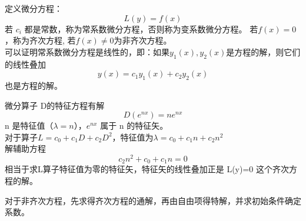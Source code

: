 \begin{frame}
    定义微分方程：
    \begin{equation*}
    	L(y)=f(x)
    \end{equation*}
    若{ $c_i$} 都是常数，称为常系数微分方程，否则称为变系数微分方程。 若$f(x)=0$，称为齐次方程, 若$f(x)\ne0$为非齐次方程。\\ 
	可以证明常系数微分方程是线性的，即：如果$y_1(x) ,  y_2(x) $是方程的解，则它们的线性叠加
    \begin{equation*}
    	y(x)=c_1y_1(x) +c_2y_2(x) 
    \end{equation*}	
    也是方程的解。
\end{frame}

\begin{frame}	
	微分算子 D的特征方程有解
	\begin{equation*}
		D(e^{nx})=n e^{nx}
	\end{equation*}	
	n 是特征值（$\lambda=n$），$e^{nx}$ 属于 n 的特征矢。\\
	对于算子$L= c_0 + c_1D +c_2D^2 $，特征值为$\lambda=c_0 + c_1n +c_2n^2$ \\
	解辅助方程
	\begin{equation*}
		c_2 n^2 + c_0 + c_1 n =0
	\end{equation*}	
	相当于求L算子特征值为零的特征矢，特征矢的线性叠加正是 L(y)=0 这个齐次方程的解。
\end{frame}

\begin{frame}
	对于非齐次方程，先求得齐次方程的通解，再由自由项得特解，并求初始条件确定系数。
\end{frame}
